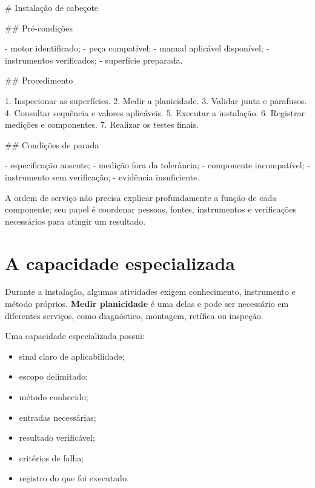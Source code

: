 \documentclass[
  10pt,
  a4paper,
  oneside]{book}
\newenvironment{Shaded}{}{}
\newcommand{\FunctionTok}[1]{\textcolor[rgb]{0.02,0.16,0.49}{#1}}
\newcommand{\NormalTok}[1]{#1}
\newcommand{\SpecialStringTok}[1]{\textcolor[rgb]{0.73,0.40,0.53}{#1}}
\providecommand{\tightlist}{%
  \setlength{\itemsep}{0pt}\setlength{\parskip}{0pt}}
\renewenvironment{Shaded}{\begin{snugshade}}{\end{snugshade}}%
\begin{document}
\begin{Shaded}
\begin{Highlighting}[]
\FunctionTok{\# Instalação de cabeçote}

\FunctionTok{\#\# Pré{-}condições}

\SpecialStringTok{{-} }\NormalTok{motor identificado;}
\SpecialStringTok{{-} }\NormalTok{peça compatível;}
\SpecialStringTok{{-} }\NormalTok{manual aplicável disponível;}
\SpecialStringTok{{-} }\NormalTok{instrumentos verificados;}
\SpecialStringTok{{-} }\NormalTok{superfície preparada.}

\FunctionTok{\#\# Procedimento}

\SpecialStringTok{1. }\NormalTok{Inspecionar as superfícies.}
\SpecialStringTok{2. }\NormalTok{Medir a planicidade.}
\SpecialStringTok{3. }\NormalTok{Validar junta e parafusos.}
\SpecialStringTok{4. }\NormalTok{Consultar sequência e valores aplicáveis.}
\SpecialStringTok{5. }\NormalTok{Executar a instalação.}
\SpecialStringTok{6. }\NormalTok{Registrar medições e componentes.}
\SpecialStringTok{7. }\NormalTok{Realizar os testes finais.}

\FunctionTok{\#\# Condições de parada}

\SpecialStringTok{{-} }\NormalTok{especificação ausente;}
\SpecialStringTok{{-} }\NormalTok{medição fora da tolerância;}
\SpecialStringTok{{-} }\NormalTok{componente incompatível;}
\SpecialStringTok{{-} }\NormalTok{instrumento sem verificação;}
\SpecialStringTok{{-} }\NormalTok{evidência insuficiente.}
\end{Highlighting}
\end{Shaded}

A ordem de serviço não precisa explicar profundamente a função de cada
componente; seu papel é coordenar pessoas, fontes, instrumentos e
verificações necessários para atingir um resultado.

\hypertarget{a-capacidade-especializada}{%
\section{A capacidade especializada}\label{a-capacidade-especializada}}

Durante a instalação, algumas atividades exigem conhecimento,
instrumento e método próprios. \textbf{Medir planicidade} é uma delas e
pode ser necessário em diferentes serviços, como diagnóstico, montagem,
retífica ou inspeção.

Uma capacidade especializada possui:

\begin{itemize}
\tightlist
\item
  sinal claro de aplicabilidade;
\item
  escopo delimitado;
\item
  método conhecido;
\item
  entradas necessárias;
\item
  resultado verificável;
\item
  critérios de falha;
\item
  registro do que foi executado.
\end{itemize}
\end{document}
